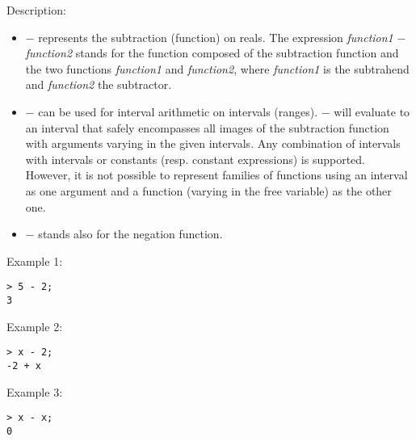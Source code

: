 \noindent Description: \begin{itemize}

\item \textbf{$-$} represents the subtraction (function) on reals. 
   The expression \emph{function1} \textbf{$-$} \emph{function2} stands for
   the function composed of the subtraction function and the two
   functions \emph{function1} and \emph{function2}, where \emph{function1} is 
   the subtrahend and \emph{function2} the subtractor.

\item \textbf{$-$} can be used for interval arithmetic on intervals
   (ranges). \textbf{$-$} will evaluate to an interval that safely
   encompasses all images of the subtraction function with arguments varying
   in the given intervals.  Any combination of intervals with intervals
   or constants (resp. constant expressions) is supported. However, it is
   not possible to represent families of functions using an interval as
   one argument and a function (varying in the free variable) as the
   other one.

\item \textbf{$-$} stands also for the negation function.
\end{itemize}
\noindent Example 1: 
\begin{center}\begin{minipage}{15cm}\begin{Verbatim}[frame=single,commandchars=\\\|\~]
> 5 - 2;
3
\end{Verbatim}
\end{minipage}\end{center}
\noindent Example 2: 
\begin{center}\begin{minipage}{15cm}\begin{Verbatim}[frame=single,commandchars=\\\|\~]
> x - 2;
-2 + x
\end{Verbatim}
\end{minipage}\end{center}
\noindent Example 3: 
\begin{center}\begin{minipage}{15cm}\begin{Verbatim}[frame=single,commandchars=\\\|\~]
> x - x;
0
\end{Verbatim}
\end{minipage}\end{center}
